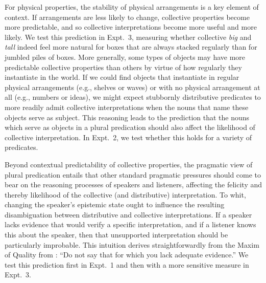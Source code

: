 \documentclass[preprint,12pt,authoryear,titlepage]{elsarticle}
\newcommand{\ndg}[1]{\textcolor{Green}{[ndg: #1]}}
\newcommand{\gcs}[1]{\textcolor{blue}{[gcs: #1]}}
\begin{document}
For physical properties, the stability of physical arrangements is a key element of context. If arrangements are less likely to change, collective properties become more predictable, and so collective interpretations become more useful and more likely. 
We test this prediction in Expt.~3, measuring whether collective \emph{big} and \emph{tall} indeed feel more natural for boxes that are always stacked regularly than for jumbled piles of boxes.
More generally, some types of objects may have more predictable collective properties than others by virtue of how regularly they instantiate in the world.  If we could find objects that instantiate in regular physical arrangements (e.g., shelves or waves) or with no physical arrangement at all (e.g., numbers or ideas), we might expect stubbornly distributive predicates to more readily admit collective interpretations when the nouns that name these objects serve as subject.
This reasoning leads to the prediction that the nouns which serve as objects in a plural predication should also affect the likelihood of collective interpretation. %
In Expt.~2, we test whether this holds for a variety of predicates.

Beyond contextual predictability of collective properties, the pragmatic view of plural predication entails that other standard pragmatic pressures should come to bear on the reasoning processes of speakers and listeners, affecting the felicity and thereby likelihood of the collective (and distributive) interpretation.
To whit, changing the speaker's epistemic state ought to influence the resulting disambiguation between distributive and collective interpretations. 
If a speaker lacks evidence that would verify a specific interpretation, and if a listener knows this about the speaker, then that unsupported interpretation should be particularly improbable. This intuition derives straightforwardly from the Maxim of Quality from \cite{grice1975}: ``Do not say that for which you lack adequate evidence.'' 
We test this prediction first in Expt.~1 and then with a more sensitive measure in Expt.~3.

\end{document}
